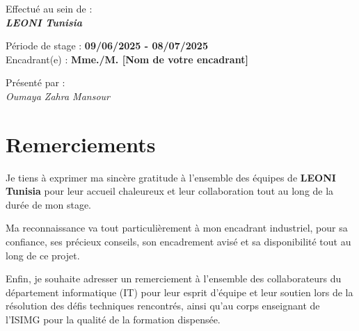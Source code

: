 \documentclass[12pt,a4paper]{report}
\begin{document}
\begin{titlepage}
\begin{center}
        {\large Effectué au sein de :} \\[0.8cm]
        
        {\Large \textbf{\textit{LEONI Tunisia}}} \\[2cm]
        
    \end{center}
    
    \begin{flushleft}
        {\large Période de stage : \textbf{09/06/2025 - 08/07/2025}} \\[0.8cm]
        {\large Encadrant(e) : \textbf{Mme./M. [Nom de votre encadrant]}}
    \end{flushleft}
    
    \begin{center}
        \vspace{0.5cm}
        {\large Présenté par :} \\[0.3cm]
        {\large \textit{Oumaya Zahra Mansour}}
    \end{center}
\end{titlepage}

\chapter*{Remerciements}
Je tiens à exprimer ma sincère gratitude à l'ensemble des équipes de \textbf{LEONI Tunisia} pour leur accueil chaleureux et leur collaboration tout au long de la durée de mon stage. 

Ma reconnaissance va tout particulièrement à mon encadrant industriel, pour sa confiance, ses précieux conseils, son encadrement avisé et sa disponibilité tout au long de ce projet.

Enfin, je souhaite adresser un remerciement à l'ensemble des collaborateurs du département informatique (IT) pour leur esprit d'équipe et leur soutien lors de la résolution des défis techniques rencontrés, ainsi qu'au corps enseignant de l'ISIMG pour la qualité de la formation dispensée.

\tableofcontents
\end{document}
